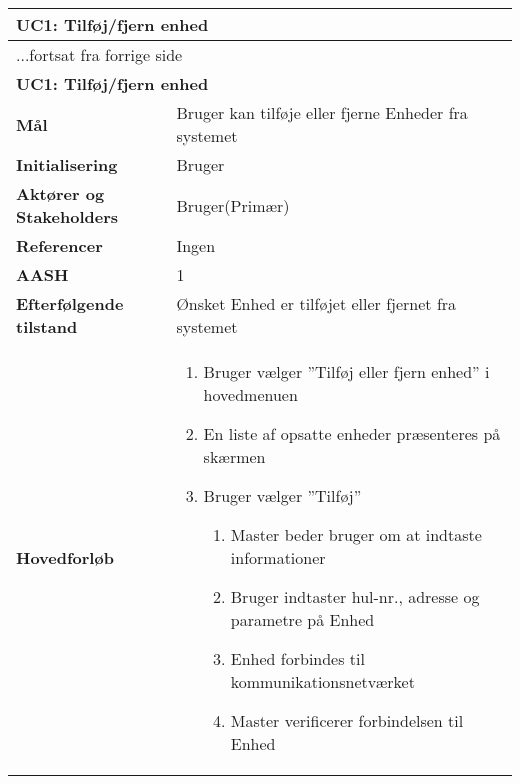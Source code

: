 \begin{center} \centering \label{UC1}
	\begin{longtable}{|p{5cm}|p{9cm}|}  %
	\hline
		\multicolumn{2}{|l|}{\textbf{UC1: Tilføj\slash fjern enhed}} \\\hline %
		\endfirsthead
		
		\multicolumn{2}{l}{...fortsat fra forrige side} \\ \hline %
		\multicolumn{2}{|l|}{\textbf{UC1: Tilføj\slash fjern enhed}} \\\hline %
		\endhead	
		
		\textbf{Mål}								&Bruger kan tilføje eller fjerne Enheder fra systemet			\\\hline
		\textbf{Initialisering}					&Bruger														\\\hline
		\textbf{Aktører og Stakeholders}			&Bruger(Primær)												\\\hline 
		\textbf{Referencer}						&Ingen														\\\hline
		\textbf{AASH}							&1															\\\hline
		\textbf{Efterfølgende tilstand}			&Ønsket Enhed er tilføjet eller fjernet fra systemet		\\\hline
		\textbf{Hovedforløb}					
			&\begin{enumerate}
	
				\item Bruger vælger ''Tilføj eller fjern enhed'' i hovedmenuen
				
				\item En liste af opsatte enheder præsenteres på skærmen				
				
				\item \label{uc1valg} Bruger vælger ''Tilføj''
				
				\begin{enumerate}
					\item \label{uc1indtast} Master beder bruger om at indtaste informationer
					
					\item \label{uc1indtast_fejl} Bruger indtaster hul-nr., adresse og parametre på Enhed
										
					\item Enhed forbindes til kommunikationsnetværket
					
					\item \label{uc1verif} Master verificerer forbindelsen til Enhed
						

\end{enumerate}
\end{enumerate}
\end{longtable}
\end{center}
